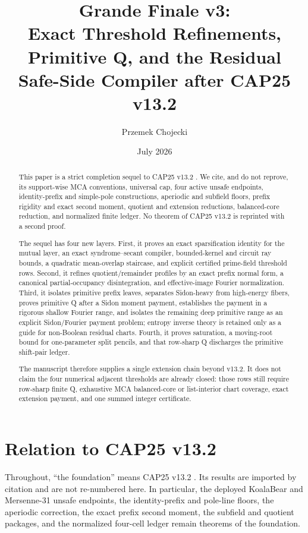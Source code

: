 \documentclass[11pt,a4paper]{amsart}
\title[Grande Finale v3]{Grande Finale v3:\\ Exact Threshold Refinements, Primitive Q, and the Residual Safe-Side Compiler after CAP25 v13.2}
\author{Przemek Chojecki}
\date{July 2026}
\numberwithin{equation}{section}
\theoremstyle{remark}
\begin{document}
\begin{abstract}
This paper is a strict completion sequel to CAP25 v13.2 \cite{CAP25v132}.  We cite, and do not reprove, its support-wise MCA conventions, universal cap, four active unsafe endpoints, identity-prefix and simple-pole constructions, aperiodic and subfield floors, prefix rigidity and exact second moment, quotient and extension reductions, balanced-core reduction, and normalized finite ledger.  No theorem of CAP25 v13.2 is reprinted with a second proof.

The sequel has four new layers.  First, it proves an exact sparsification identity for the mutual layer, an exact syndrome--secant compiler, bounded-kernel and circuit ray bounds, a quadratic mean-overlap staircase, and explicit certified prime-field threshold rows.  Second, it refines quotient/remainder profiles by an exact prefix normal form, a canonical partial-occupancy disintegration, and effective-image Fourier normalization.  Third, it isolates primitive prefix leaves, separates Sidon-heavy from high-energy fibers, proves primitive Q after a Sidon moment payment, establishes the payment in a rigorous shallow Fourier range, and isolates the remaining deep primitive range as an explicit Sidon/Fourier payment problem; entropy inverse theory is retained only as a guide for non-Boolean residual charts.  Fourth, it proves saturation, a moving-root bound for one-parameter split pencils, and that row-sharp Q discharges the primitive shift-pair ledger.

The manuscript therefore supplies a single extension chain beyond v13.2.  It does not claim the four numerical adjacent thresholds are already closed: those rows still require row-sharp finite Q, exhaustive MCA balanced-core or list-interior chart coverage, exact extension payment, and one summed integer certificate.
\end{abstract}
\maketitle
\tableofcontents

\section{Relation to CAP25 v13.2}\label{sec:relation-v132}
Throughout, ``the foundation'' means CAP25 v13.2 \cite{CAP25v132}.  Its results are imported by citation and are not re-numbered here.  In particular, the deployed KoalaBear and Mersenne-31 unsafe endpoints, the identity-prefix and pole-line floors, the aperiodic correction, the exact prefix second moment, the subfield and quotient packages, and the normalized four-cell ledger remain theorems of the foundation.
\end{document}
